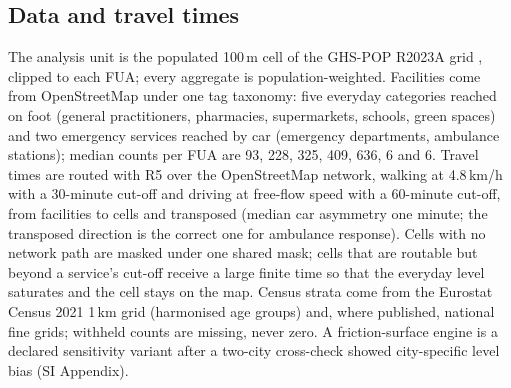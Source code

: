 \documentclass[9pt,twocolumn]{article}
\begin{document}
\subsection*{Data and travel times}
The analysis unit is the populated 100\,m cell of the GHS-POP R2023A grid
\citep{schiavina2023ghspop}, clipped to each FUA; every aggregate is
population-weighted. Facilities come from OpenStreetMap under one tag
taxonomy: five everyday categories reached on foot (general
practitioners, pharmacies, supermarkets, schools, green spaces) and two
emergency services reached by car (emergency departments, ambulance
stations); median counts per FUA are 93, 228, 325, 409, 636, 6 and 6.
Travel times are routed with R5 \citep{fink2022r5py} over the
OpenStreetMap network, walking at 4.8\,km/h with a 30-minute cut-off and
driving at free-flow speed with a 60-minute cut-off, from facilities to
cells and transposed (median car asymmetry one minute; the transposed
direction is the correct one for ambulance response). Cells with no
network path are masked under one shared mask; cells that are routable
but beyond a service's cut-off receive a large finite time so that the
everyday level saturates and the cell stays on the map. Census strata come
from the Eurostat Census 2021 1\,km grid (harmonised age groups) and,
where published, national fine grids; withheld counts are missing, never
zero. A friction-surface engine \citep{weiss2020healthcare} is a declared
sensitivity variant after a two-city cross-check showed city-specific
level bias (SI Appendix).
\end{document}

